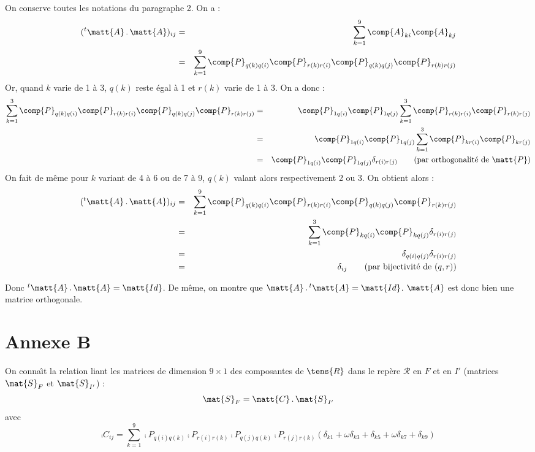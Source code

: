 On conserve toutes les notations du paragraphe 2. On a :
\begin{eqnarray}
(^t\matt{A}\,.\,\matt{A})_{ij}
& = & \sum_{k=1}^9\comp{A}_{ki}\comp{A}_{kj}\nonumber\\
& = & \sum_{k=1}^9
\comp{P}_{q(k)q(i)}\comp{P}_{r(k)r(i)}\comp{P}_{q(k)q(j)}\comp{P}_{r(k)r(j)}
\end{eqnarray}
Or, quand $k$ varie de 1 \`a 3, $q(k)$ reste \'egal \`a 1 et $r(k)$ varie de 1
\`a 3. On a donc :
\begin{eqnarray}
\sum_{k=1}^3
\comp{P}_{q(k)q(i)}\comp{P}_{r(k)r(i)}\comp{P}_{q(k)q(j)}\comp{P}_{r(k)r(j)}
&=&\comp{P}_{1q(i)}\comp{P}_{1q(j)}\sum_{k=1}^3
\comp{P}_{r(k)r(i)}\comp{P}_{r(k)r(j)}\nonumber\\
&=&\comp{P}_{1q(i)}\comp{P}_{1q(j)}\sum_{k=1}^3
\comp{P}_{kr(i)}\comp{P}_{kr(j)}\\
&=&\comp{P}_{1q(i)}\comp{P}_{1q(j)}\delta_{r(i)r(j)}\qquad\text{(par
orthogonalit\'e de $\matt{P}$)}\nonumber
\end{eqnarray}
On fait de m\^eme pour $k$ variant de 4 \`a 6 ou de 7 \`a 9, $q(k)$ valant alors
respectivement 2 ou 3. On obtient alors :
\begin{eqnarray}
(^t\matt{A}\,.\,\matt{A})_{ij}
&=&
\sum_{k=1}^9
\comp{P}_{q(k)q(i)}\comp{P}_{r(k)r(i)}\comp{P}_{q(k)q(j)}\comp{P}_{r(k)r(j)}
\nonumber\\
&=&
\sum_{k=1}^3\comp{P}_{kq(i)}\comp{P}_{kq(j)}\delta_{r(i)r(j)}\\
&=&\delta_{q(i)q(j)}\delta_{r(i)r(j)}\nonumber\\
&=&\delta_{ij}\qquad
\text{(par bijectivit\'e de $(q,r)$)}\nonumber
\end{eqnarray}

Donc $^t\matt{A}\,.\,\matt{A}=\matt{Id}$. De m\^eme, on montre que
$\matt{A}\,.\,^t\matt{A}=\matt{Id}$. $\matt{A}$ est donc bien une matrice
orthogonale.


\section{Annexe B}

On conna\^\i t la relation liant les matrices de dimension $9\times1$
des composantes de $\tens{R}$ dans le rep\`ere $\mathcal{R}$ en $F$ et en $I'$
(matrices $\mat{S}_F$ et $\mat{S}_{I'}$) :
\begin{equation}
\mat{S}_F=\matt{C}\,.\,\mat{S}_{I'}
\end{equation}
avec
\begin{equation}
\comp{C}_{ij}=\sum_{k=1}^9
\comp{P}_{q(i)q(k)}\comp{P}_{r(i)r(k)}\comp{P}_{q(j)q(k)}\comp{P}_{r(j)r(k)}
(\delta_{k1}+\omega\delta_{k3}+\delta_{k5}+\omega\delta_{k7}+\delta_{k9})
\end{equation}

